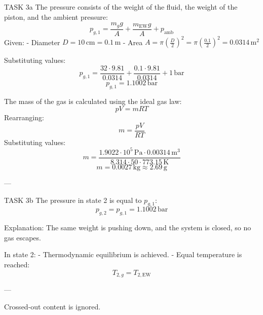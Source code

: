 TASK 3a  
The pressure consists of the weight of the fluid, the weight of the piston, and the ambient pressure:  
\[
p_{g,1} = \frac{m_g g}{A} + \frac{m_{\text{EW}} g}{A} + p_{\text{amb}}
\]  
Given:  
- Diameter \( D = 10 \, \text{cm} = 0.1 \, \text{m} \)  
- Area \( A = \pi \left(\frac{D}{2}\right)^2 = \pi \left(\frac{0.1}{2}\right)^2 = 0.0314 \, \text{m}^2 \)  

Substituting values:  
\[
p_{g,1} = \frac{32 \cdot 9.81}{0.0314} + \frac{0.1 \cdot 9.81}{0.0314} + 1 \, \text{bar}
\]  
\[
p_{g,1} = 1.1002 \, \text{bar}
\]  

The mass of the gas is calculated using the ideal gas law:  
\[
pV = mRT
\]  
Rearranging:  
\[
m = \frac{pV}{RT}
\]  
Substituting values:  
\[
m = \frac{1.9022 \cdot 10^5 \, \text{Pa} \cdot 0.00314 \, \text{m}^3}{8.314 \cdot 50 \cdot 773.15 \, \text{K}}
\]  
\[
m = 0.0027 \, \text{kg} \approx 2.69 \, \text{g}
\]  

---

TASK 3b  
The pressure in state 2 is equal to \( p_{g,1} \):  
\[
p_{g,2} = p_{g,1} = 1.1002 \, \text{bar}
\]  

Explanation:  
The same weight is pushing down, and the system is closed, so no gas escapes.  

In state 2:  
- Thermodynamic equilibrium is achieved.  
- Equal temperature is reached:  
\[
T_{2,g} = T_{2,\text{EW}}
\]  

---

Crossed-out content is ignored.
